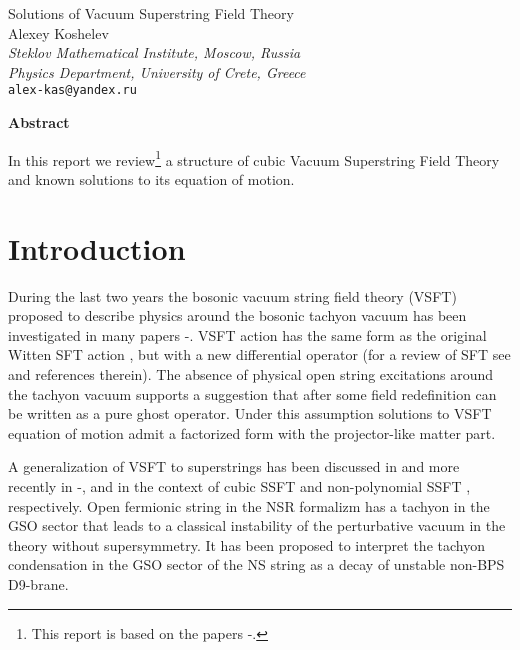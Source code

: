 \documentclass[a4paper,12pt]{article}
\begin{document}
\begin{center}
{\LARGE Solutions of Vacuum Superstring Field
Theory}\\
Alexey Koshelev\\
\textit{\small{Steklov Mathematical Institute, Moscow, Russia}}\\
\textit{\small{Physics Department, University of Crete, Greece}}\\
\texttt{\small{alex-kas@yandex.ru}}
\end{center}

\centerline{\textbf{Abstract}} 
In this report we
review\footnote{This report is based on the papers
\cite{ia_vssft}-\cite{ia_nsgs}.} a structure of cubic Vacuum
Superstring Field Theory and known solutions to its equation of
motion.
\section{Introduction}

During the last two years the bosonic vacuum string field theory (VSFT)
 proposed to describe physics around  the bosonic tachyon vacuum
  \cite{F2} has been  investigated in many papers
\cite{zwiebach}-\cite{Ohmori}.
VSFT action has the same form as
the original Witten SFT action \cite{Witten},
but with a new differential operator \coordHE{} (for a review of
SFT see \cite{0102085,0109182,ABGKM} and references therein). The
absence of physical open string excitations around the tachyon
vacuum \cite{sen-con,Hata1}
supports a suggestion \cite{F2} that after some field
redefinition \coordHE{} can be written as a pure ghost
operator.  Under this assumption
solutions to VSFT equation of motion
admit a  factorized form with the projector-like matter part.

A generalization of VSFT
to superstrings has been discussed in \cite{F2} and more recently in
\cite{ia_vssft}-\cite{ia_nsgs},\cite{Ohmori}
and \cite{Marino} in the context of cubic SSFT \cite{PTY,AMZ1} and
non-polynomial SSFT \cite{0002211},
respectively.
Open fermionic string in the NSR formalizm has a
tachyon in the GSO\myHighlight{$-$}\coordHE{} sector that leads to a classical instability of
the perturbative vacuum in the theory without supersymmetry. It
has been proposed  \cite{sen-con} to interpret the tachyon
condensation in the GSO\myHighlight{$-$}\coordHE{} sector of the NS string as a decay of unstable
non-BPS D9-brane.
\end{document}
